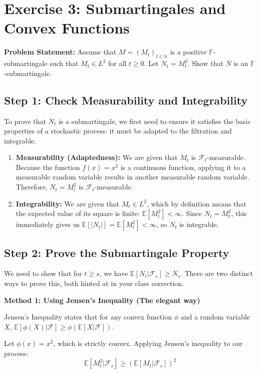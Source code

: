\section{Exercise 3: Submartingales and Convex Functions}

\textbf{Problem Statement:} Assume that $M = (M_t)_{t\in\mathbb{N}}$ is a positive $\mathbb{F}$-submartingale such that $M_t \in L^2$ for all $t \ge 0$. Let $N_t = M_t^2$. Show that $N$ is an $\mathbb{F}$-submartingale.

\subsection*{Step 1: Check Measurability and Integrability}
To prove that $N_t$ is a submartingale, we first need to ensure it satisfies the basic properties of a stochastic process: it must be adapted to the filtration and integrable.

\begin{enumerate}
    \item \textbf{Measurability (Adaptedness):} We are given that $M_t$ is $\mathcal{F}_t$-measurable. Because the function $f(x) = x^2$ is a continuous function, applying it to a measurable random variable results in another measurable random variable. Therefore, $N_t = M_t^2$ is $\mathcal{F}_t$-measurable.
    \item \textbf{Integrability:} We are given that $M_t \in L^2$, which by definition means that the expected value of its square is finite: $\mathbb{E}[M_t^2] < \infty$. Since $N_t = M_t^2$, this immediately gives us $\mathbb{E}[|N_t|] = \mathbb{E}[M_t^2] < \infty$, so $N_t$ is integrable.
\end{enumerate}

\subsection*{Step 2: Prove the Submartingale Property}
We need to show that for $t \ge s$, we have $\mathbb{E}[N_t | \mathcal{F}_s] \ge N_s$. There are two distinct ways to prove this, both hinted at in your class correction.

\vspace{0.5cm}
\textbf{Method 1: Using Jensen's Inequality (The elegant way)}

Jensen's Inequality states that for any convex function $\phi$ and a random variable $X$, $\mathbb{E}[\phi(X) | \mathcal{F}] \ge \phi(\mathbb{E}[X | \mathcal{F}])$. 

Let $\phi(x) = x^2$, which is strictly convex. Applying Jensen's inequality to our process:
\[ \mathbb{E}[M_t^2 | \mathcal{F}_s] \ge (\mathbb{E}[M_t | \mathcal{F}_s])^2 \]

